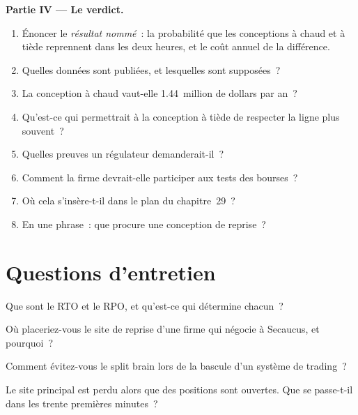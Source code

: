 \begin{problem}
\medskip\noindent\textbf{Partie IV --- Le verdict.}
\begin{enumerate}[resume]
\item Énoncer le \emph{résultat nommé}~: la probabilité que les conceptions à chaud et à tiède reprennent dans les deux heures, et le coût annuel de la
  différence.
\item Quelles données sont publiées, et lesquelles sont supposées~?
\item La conception à chaud vaut-elle 1.44~million de dollars par an~?
\item Qu'est-ce qui permettrait à la conception à tiède de respecter la ligne plus souvent~?
\item Quelles preuves un régulateur demanderait-il~?
\item Comment la firme devrait-elle participer aux tests des bourses~?
\item Où cela s'insère-t-il dans le plan du chapitre~29~?
\item En une phrase~: que procure une conception de reprise~?
\end{enumerate}
\end{problem}

\section{Questions d'entretien}

\begin{interviewq}\label{iq:nw:disaster-recovery-and-regulatory-requirements:1}
Que sont le RTO et le RPO, et qu'est-ce qui détermine chacun~?
\end{interviewq}

\begin{interviewq}\label{iq:nw:disaster-recovery-and-regulatory-requirements:2}
Où placeriez-vous le site de reprise d'une firme qui négocie à Secaucus, et pourquoi~?
\end{interviewq}

\begin{interviewq}\label{iq:nw:disaster-recovery-and-regulatory-requirements:3}
Comment évitez-vous le split brain lors de la bascule d'un système de trading~?
\end{interviewq}

\begin{interviewq}\label{iq:nw:disaster-recovery-and-regulatory-requirements:4}
Le site principal est perdu alors que des positions sont ouvertes. Que se passe-t-il dans les trente premières minutes~?
\end{interviewq}

